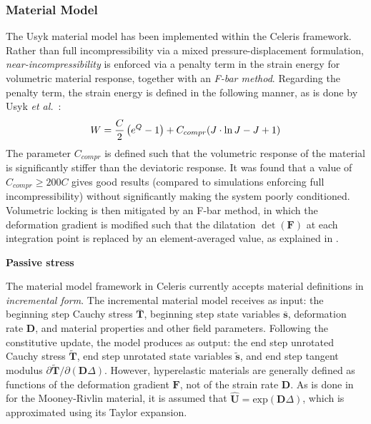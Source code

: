 \subsubsection{Material Model}
The Usyk material model has been implemented within the Celeris framework. Rather than full incompressibility via a mixed pressure-displacement formulation, \textit{near-incompressibility} is enforced via a penalty term in the strain energy for volumetric material response, together with an \textit{F-bar method}. Regarding the penalty term, the strain energy is defined in the following manner, as is done by Usyk \textit{et al.}~\cite{usyk_2002}:
\begin{equation}
W = \frac{C}{2}\left(e^Q -1\right) + C_{compr} (J \cdot \ln J - J + 1) \\
\end{equation}
The parameter $C_{compr}$ is defined such that the volumetric response of the material is significantly stiffer than the deviatoric response. It was found that a value of $C_{compr} \geq 200  C$ gives good results (compared to simulations enforcing full incompressibility) without significantly making the system poorly conditioned. Volumetric locking is then mitigated by an F-bar method, in which the deformation gradient is modified such that the dilatation $\det(\bm{F})$ at each integration point is replaced by an element-averaged value, as explained in .

\textbf{Passive stress}

The material model framework in Celeris currently accepts material definitions in \textit{incremental form}. The incremental material model receives as input: the beginning step Cauchy stress $\overline{\bm{T}}$, beginning step state variables $\overline{\bm{s}}$, deformation rate $\bm{D}$, and material properties and other field parameters. Following the constitutive update, the model produces as output: the end step unrotated Cauchy stress $\tilde{\bm{T}}$, end step unrotated state variables $\tilde{\bm{s}}$, and end step tangent modulus ${\partial \tilde{\bm{T}}}/{\partial (\bm{D}\Delta)}$. However, hyperelastic materials are generally defined as functions of the deformation gradient $\bm{F}$, not of the strain rate $\bm{D}$. As is done in  for the Mooney-Rivlin material, it is assumed that $\hat{\bm{U}} = \text{exp}(\bm{D}\Delta)$, which is approximated using its Taylor expansion.

